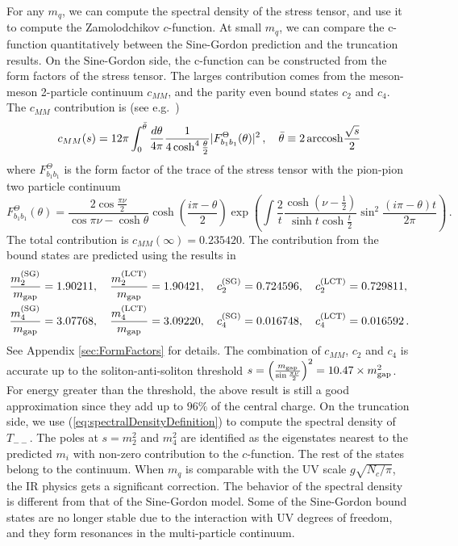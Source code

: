 \documentclass[12pt]{article}
\newcommand{\Nc}{N_c}
\begin{document}
For any $m_q$, we can compute the spectral density of the stress tensor, and use it to compute the Zamolodchikov $c$-function.
At small $m_q$, we can compare the c-function quantitatively between the Sine-Gordon prediction and the truncation results. On the Sine-Gordon side, the c-function can be constructed from the form factors of the stress tensor. The larges contribution comes from the meson-meson 2-particle continuum $c_{MM}$, and the parity even bound states $c_2$ and $c_4$.
The $c_{MM}$ contribution is (see e.g.~\cite{Karateev:2019ymz})
\begin{equation}
c_{MM}(s) = 12\pi \int_0^{\bar\theta} \frac{d\theta}{4\pi} 
\frac{1}{4\cosh ^4 \frac{\theta }{2} }
|F^{\Theta}_{b_1b_1}(\theta)|^2  \, , \quad \bar\theta\equiv 2 \,{\rm arccosh}\frac{\sqrt{s}}{2}
\end{equation}
where $F^{\Theta}_{b_1b_1}$ is the form factor of the trace of the stress tensor with the pion-pion two particle continuum
\begin{equation}
F^{\Theta}_{b_1b_1}(\theta) = 
\frac{2\cos\frac{\pi \nu}{2} }{\cos\pi\nu - \cosh\theta}
\cosh \left( \frac{i \pi-\theta}{2}  \right)
\exp \left(
    \int \frac{2}{t}
    \frac{\cosh \left(\nu -\frac{1}{2}\right) }{ \sinh t \cosh \frac{t}{2}}
    \sin ^2\frac{(i \pi-\theta ) t}{2 \pi }
\right) \, .
\end{equation}
The total contribution is $c_{MM}(\infty) = 0.235420$.
The contribution from the bound states are predicted using the results in \cite{Babujian:1998uw,Babujian:2001xn}
\begin{equation}
\label{eq:BoundStateFormFactors}
\begin{aligned}
&\frac{m_2^{(\rm SG)}}{m_{\rm gap}} = 1.90211, \quad \frac{m_2^{(\rm LCT)}}{m_{\rm gap}} = 1.90421, \quad c_2^{\rm(SG)} = 0.724596, \quad c_2^{\rm(LCT)} = 0.729811, \\
&\frac{m_4^{(\rm SG)}}{m_{\rm gap}} = 3.07768, \quad \frac{m_4^{(\rm LCT)}}{m_{\rm gap}} = 3.09220, \quad c_4^{\rm(SG)} = 0.016748, \quad c_4^{\rm(LCT)} = 0.016592 \, .
\end{aligned}
\end{equation}
See Appendix \ref{sec:FormFactors} for details. 
The combination of $c_{MM}$, $c_2$ and $c_4$ is accurate up to the soliton-anti-soliton threshold $s = \left( \frac{m_{\rm gap}}{ \sin\frac{\pi\nu}{2}} \right)^2 = 10.47 \times m_{\rm gap}^2$. For energy greater than the threshold, the above result is still a good approximation since they add up to $96\%$ of the central charge.
On the truncation side, we use (\ref{eq:spectralDensityDefinition}) to compute the spectral density of $T_{--}$.  The poles at $s=m_2^2$ and $m_4^2$ are identified as the eigenstates nearest to the predicted $m_i$ with non-zero contribution to the $c$-function. The rest of the states belong to the continuum. 
When $m_q$ is comparable with the UV scale $g \sqrt{\Nc/\pi}$, the IR physics gets a significant correction. The behavior of the spectral density is different from that of the Sine-Gordon model. Some of the Sine-Gordon bound states are no longer stable due to the interaction with UV degrees of freedom, and they form resonances in the multi-particle continuum. 
\end{document}
